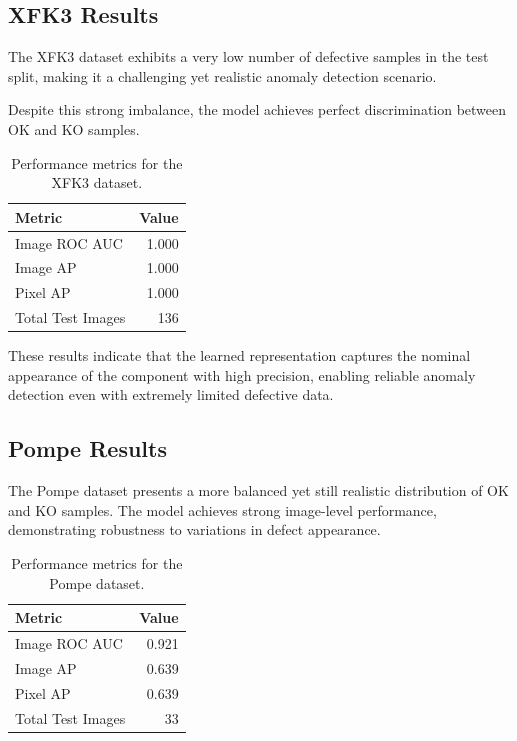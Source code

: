 \documentclass{article}
\begin{document}
\subsection{XFK3 Results}

The XFK3 dataset exhibits a very low number of defective samples in the test split, making it a challenging yet realistic anomaly detection scenario.

Despite this strong imbalance, the model achieves perfect discrimination between OK and KO samples.

\begin{table}[htbp]
    \centering
    \begin{tabular}{l r}
        \hline
        \textbf{Metric} & \textbf{Value} \\
        \hline
        Image ROC AUC & 1.000 \\
        Image AP & 1.000 \\
        Pixel AP & 1.000 \\
        Total Test Images & 136 \\
        \hline
    \end{tabular}
    \caption{Performance metrics for the XFK3 dataset.}
    \label{tab:xfk3_results}
\end{table}

These results indicate that the learned representation captures the nominal appearance of the component with high precision, enabling reliable anomaly detection even with extremely limited defective data.

\subsection{Pompe Results}

The Pompe dataset presents a more balanced yet still realistic distribution of OK and KO samples.
The model achieves strong image-level performance, demonstrating robustness to variations in defect appearance.

\begin{table}[htbp]
    \centering
    \begin{tabular}{l r}
        \hline
        \textbf{Metric} & \textbf{Value} \\
        \hline
        Image ROC AUC & 0.921 \\
        Image AP & 0.639 \\
        Pixel AP & 0.639 \\
        Total Test Images & 33 \\
        \hline
    \end{tabular}
    \caption{Performance metrics for the Pompe dataset.}
    \label{tab:pompe_results}
\end{table}
\end{document}
